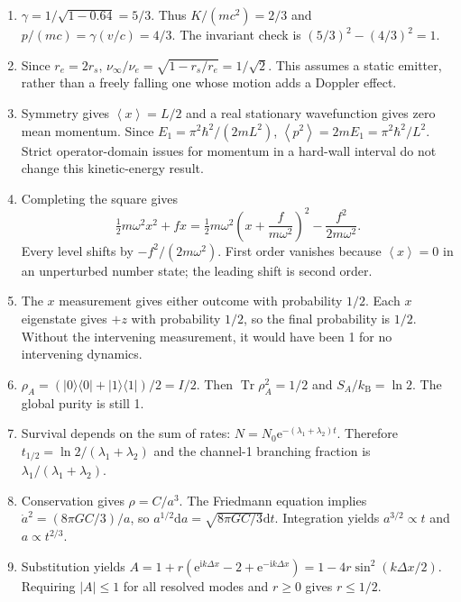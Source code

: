 \documentclass[11pt,oneside]{book}
\newcommand{\dd}{\mathrm{d}}
\newcommand{\ii}{\mathrm{i}}
\newcommand{\ee}{\mathrm{e}}
\newcommand{\avg}[1]{\left\langle #1\right\rangle}
\newcommand{\ket}[1]{\lvert #1\rangle}
\newcommand{\bra}[1]{\langle #1\rvert}
\newcommand{\kb}{k_{\mathrm B}}
\theoremstyle{reviewstyle}
\begin{document}
\begin{enumerate}
\item $\gamma=1/\sqrt{1-0.64}=5/3$. Thus $K/(mc^2)=2/3$ and $p/(mc)=\gamma(v/c)=4/3$. The invariant check is $(5/3)^2-(4/3)^2=1$.
\item Since $r_e=2r_s$, $\nu_\infty/\nu_e=\sqrt{1-r_s/r_e}=1/\sqrt2$. This assumes a static emitter, rather than a freely falling one whose motion adds a Doppler effect.
\item Symmetry gives $\avg x=L/2$ and a real stationary wavefunction gives zero mean momentum. Since $E_1=\pi^2\hbar^2/(2mL^2)$, $\avg{p^2}=2mE_1=\pi^2\hbar^2/L^2$. Strict operator-domain issues for momentum in a hard-wall interval do not change this kinetic-energy result.
\item Completing the square gives
\[
\tfrac12m\omega^2x^2+fx=\tfrac12m\omega^2\left(x+\frac f{m\omega^2}\right)^2-\frac{f^2}{2m\omega^2}.
\]
Every level shifts by $-f^2/(2m\omega^2)$. First order vanishes because $\avg x=0$ in an unperturbed number state; the leading shift is second order.
\item The $x$ measurement gives either outcome with probability $1/2$. Each $x$ eigenstate gives $+z$ with probability $1/2$, so the final probability is $1/2$. Without the intervening measurement, it would have been 1 for no intervening dynamics.
\item $\rho_A=(\ket0\bra0+\ket1\bra1)/2=I/2$. Then $\operatorname{Tr}\rho_A^2=1/2$ and $S_A/\kb=\ln2$. The global purity is still 1.
\item Survival depends on the sum of rates: $N=N_0\ee^{-(\lambda_1+\lambda_2)t}$. Therefore $t_{1/2}=\ln2/(\lambda_1+\lambda_2)$ and the channel-1 branching fraction is $\lambda_1/(\lambda_1+\lambda_2)$.
\item Conservation gives $\rho=C/a^3$. The Friedmann equation implies $\dot a^2=(8\pi GC/3)/a$, so $a^{1/2}\dd a=\sqrt{8\pi GC/3}\dd t$. Integration yields $a^{3/2}\propto t$ and $a\propto t^{2/3}$.
\item Substitution yields $A=1+r(\ee^{\ii k\Delta x}-2+\ee^{-\ii k\Delta x})=1-4r\sin^2(k\Delta x/2)$. Requiring $|A|\leq1$ for all resolved modes and $r\geq0$ gives $r\leq1/2$.
\end{enumerate}
\end{document}
